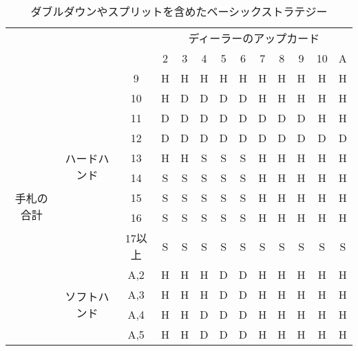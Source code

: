\begin{table}[H]
    \begin{center}
    \caption{ダブルダウンやスプリットを含めたベーシックストラテジー}
    \begin{tabular}{|c|c|c|c|c|c|c|c|c|c|c|c|c|}
    \hline
    \multicolumn{3}{|c|}{\multirow{2}{*}{}}                     & \multicolumn{10}{c|}{ディーラーのアップカード}     \\ \cline{4-13} 
    \multicolumn{3}{|c|}{}                                      & 2 & 3 & 4 & 5 & 6 & 7 & 8 & 9 & 10 & A \\ \hline
    \multirow{28}{*}{手札の合計} & \multirow{9}{*}{ハードハンド}   & 9     & H & H & H & H & H & H & H & H & H  & H \\ \cline{3-13} 
                            &                           & 10    & H & D & D & D & D & H & H & H & H  & H \\ \cline{3-13} 
                            &                           & 11    & D & D & D & D & D & D & D & D & H  & H \\ \cline{3-13} 
                            &                           & 12    & D & D & D & D & D & D & D & D & D  & D \\ \cline{3-13} 
                            &                           & 13    & H & H & S & S & S & H & H & H & H  & H \\ \cline{3-13} 
                            &                           & 14    & S & S & S & S & S & H & H & H & H  & H \\ \cline{3-13} 
                            &                           & 15    & S & S & S & S & S & H & H & H & H  & H \\ \cline{3-13} 
                            &                           & 16    & S & S & S & S & S & H & H & H & H  & H \\ \cline{3-13} 
                            &                           & 17以上  & S & S & S & S & S & S & S & S & S  & S \\ \cline{2-13} 
                            & \multirow{9}{*}{ソフトハンド}   & A,2   & H & H & H & D & D & H & H & H & H  & H \\ \cline{3-13} 
                            &                           & A,3   & H & H & H & D & D & H & H & H & H  & H \\ \cline{3-13} 
                            &                           & A,4   & H & H & D & D & D & H & H & H & H  & H \\ \cline{3-13} 
                            &                           & A,5   & H & H & D & D & D & H & H & H & H  & H \\ \cline{3-13} 

\end{tabular}
\end{center}
\end{table}
